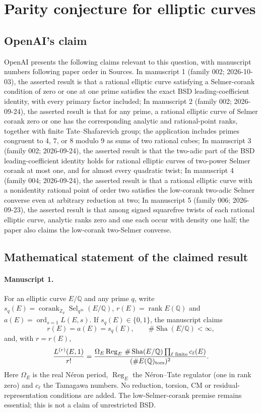 \documentclass[11pt]{article}
\begin{document}
\section*{Parity conjecture for elliptic curves}

\subsection{OpenAI's claim}
OpenAI presents the following claims relevant to this question, with manuscript numbers following paper order in Sources. In manuscript 1 (family 002; 2026-10-03), the asserted result is that a rational elliptic curve satisfying a Selmer-corank condition of zero or one at one prime satisfies the exact BSD leading-coefficient identity, with every primary factor included; In manuscript 2 (family 002; 2026-09-24), the asserted result is that for any prime, a rational elliptic curve of Selmer corank zero or one has the corresponding analytic and rational-point ranks, together with finite Tate--Shafarevich group; the application includes primes congruent to $4$, $7$, or $8$ modulo $9$ as sums of two rational cubes; In manuscript 3 (family 002; 2026-09-24), the asserted result is that the two-adic part of the BSD leading-coefficient identity holds for rational elliptic curves of two-power Selmer corank at most one, and for almost every quadratic twist; In manuscript 4 (family 004; 2026-09-24), the asserted result is that a rational elliptic curve with a nonidentity rational point of order two satisfies the low-corank two-adic Selmer converse even at arbitrary reduction at two; In manuscript 5 (family 006; 2026-09-23), the asserted result is that among signed squarefree twists of each rational elliptic curve, analytic ranks zero and one each occur with density one half; the paper also claims the low-corank two-Selmer converse.

\subsection{Mathematical statement of the claimed result}
\paragraph{Manuscript 1.}
For an elliptic curve $E/\mathbb Q$ and any prime $q$, write $s_q(E)=\operatorname{corank}_{\mathbb Z_q}\operatorname{Sel}_{q^{\infty}}(E/\mathbb Q)$, $r(E)=\operatorname{rank}E(\mathbb Q)$ and $a(E)=\operatorname{ord}_{s=1}L(E,s)$. If $s_q(E)\in\{0,1\}$, the manuscript claims
\[
 r(E)=a(E)=s_q(E),\qquad\#\operatorname{Sha}(E/\mathbb Q)<\infty,
\]
and, with $r=r(E)$,
\[
 \frac{L^{(r)}(E,1)}{r!}
 =\frac{\Omega_E\operatorname{Reg}_E\,\#\operatorname{Sha}(E/\mathbb Q)\prod_{\ell\text{ finite}}c_{\ell}(E)}
 {(\#E(\mathbb Q)_{\rm tors})^2}.
\]
Here $\Omega_E$ is the real N\'eron period, $\operatorname{Reg}_E$ the N\'eron--Tate regulator (one in rank zero) and $c_{\ell}$ the Tamagawa numbers. No reduction, torsion, CM or residual-representation conditions are added. The low-Selmer-corank premise remains essential; this is not a claim of unrestricted BSD.
\end{document}
